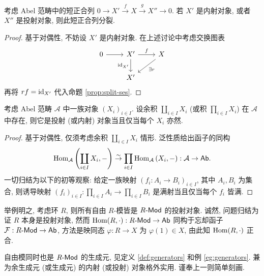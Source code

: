 \begin{lemma}\label{prop:inj-proj-split}
	考虑 Abel 范畴中的短正合列 $0 \to X' \xrightarrow{f} X \xrightarrow{g} X'' \to 0$. 若 $X'$ 是内射对象, 或者 $X''$ 是投射对象, 则此短正合列分裂.
\end{lemma}
\begin{proof}
	基于对偶性, 不妨设 $X'$ 是内射对象. 在上述讨论中考虑交换图表
	\[\begin{tikzcd}
		0 \arrow[r] & X' \arrow[r, "f"] \arrow[d, "{\identity_{X'}}"'] & X \arrow[ld, "\exists r"] \\
		& X' &
	\end{tikzcd}\]
	再将 $rf = \mathrm{id}_{X'}$ 代入命题 \ref{prop:split-ses}.
\end{proof}

\begin{lemma}\label{prop:prod-injective-projective}
	考虑 Abel 范畴 $\mathcal{A}$ 中一族对象 $(X_i)_{i \in I}$. 设余积 $\coprod_{i \in I} X_i$ (或积 $\prod_{i \in I} X_i$) 在 $\mathcal{A}$ 中存在, 则它是投射 (或内射) 对象当且仅当每个 $X_i$ 亦然.
\end{lemma}
\begin{proof}
	基于对偶性, 仅须考虑余积 $\coprod_{i \in I} X_i$ 情形. 泛性质给出函子的同构
	\[ \operatorname{Hom}_{\mathcal{A}}\left( \coprod_{i \in I} X_i, - \right) \stackrel{\sim}{\rightarrow} \prod_{i \in I} \operatorname{Hom}_{\mathcal{A}}\left( X_i, - \right): \mathcal{A} \to \mathsf{Ab}. \]
	一切归结为以下的初等观察: 给定一族映射 $\left( f_i: A_i \to B_i \right)_{i \in I}$, 其中 $A_i, B_i$ 为集合, 则诱导映射 $(f_i)_{i \in I}: \prod_{i \in I} A_i \to \prod_{i \in I} B_i$ 是满射当且仅当每个 $f_i$ 皆满.
\end{proof}

举例明之, 考虑环 $R$, 则所有自由 $R$-模皆是 $R\text{-}\mathsf{Mod}$ 的投射对象. 诚然, 问题归结为证 $R$ 本身是投射对象, 然而 $\operatorname{Hom}(R, \cdot): R\text{-}\mathsf{Mod} \to \mathsf{Ab}$ 同构于忘却函子 $\mathcal{F}: R\text{-}\mathsf{Mod} \to \mathsf{Ab}$, 方法是映同态 $\varphi: R \to X$ 为 $\varphi(1) \in X$, 由此知 $\operatorname{Hom}(R, \cdot)$ 正合.

自由模同时也是 $R\text{-}\mathsf{Mod}$ 的生成元, 见定义 \ref{def:generators} 和例 \ref{eg:generators}. 兼为余生成元 (或生成元) 的内射 (或投射) 对象格外实用. 谨奉上一则简单刻画.

